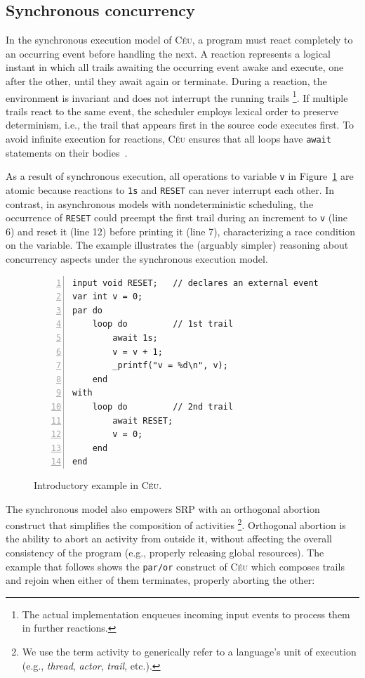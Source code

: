 \documentclass{acm_proc_article-sp}
\newcommand{\CEU}{\textsc{C\'{e}u}\xspace}
\newcommand{\code}[1] {{\small{\texttt{#1}}}}
\newcommand{\1}{\;}
\newcommand{\2}{\;\;}
\newcommand{\3}{\;\;\;}
\newcommand{\5}{\;\;\;\;\;}
\begin{document}
\subsection{Synchronous concurrency}

In the synchronous execution model of \CEU, a program must react completely to 
an occurring event before handling the next.
%
A reaction represents a logical instant in which all trails awaiting the 
occurring event awake and execute, one after the other, until they await again 
or terminate.
%
During a reaction, the environment is invariant and does not interrupt the 
running trails%
\footnote{
The actual implementation enqueues incoming input events to process them in 
further reactions.
}.
If multiple trails react to the same event, the scheduler employs lexical order 
to preserve determinism, i.e., the trail that appears first in the source code 
executes first.
%
To avoid infinite execution for reactions, \CEU ensures that all loops have 
\code{await} statements on their bodies~\cite{ceu.sensys13}.

As a result of synchronous execution, all operations to variable \code{v} in 
Figure~\ref{lst.intro} are atomic because reactions to \code{1s} and 
\code{RESET} can never interrupt each other.
%
In contrast, in asynchronous models with nondeterministic scheduling, the 
occurrence of \code{RESET} could preempt the first trail during an increment to 
\code{v} (line 6) and reset it (line 12) before printing it (line 7), 
characterizing a race condition on the variable.
%
The example illustrates the (arguably simpler) reasoning about concurrency 
aspects under the synchronous execution model.

\begin{figure}[t]
\begin{lstlisting}[numbers=left,xleftmargin=3em]
input void RESET;   // declares an external event
var int v = 0;
par do
    loop do         // 1st trail
        await 1s;
        v = v + 1;
        _printf("v = %d\n", v);
    end
with
    loop do         // 2nd trail
        await RESET;
        v = 0;
    end
end
\end{lstlisting}
\caption{ Introductory example in \CEU.
\label{lst.intro}
}
\end{figure}


The synchronous model also empowers SRP with an orthogonal abortion construct 
that simplifies the composition of activities%
\footnote{We use the term activity to generically refer to a language's unit of 
execution (e.g., \emph{thread}, \emph{actor}, \emph{trail}, etc.).}.
%
Orthogonal abortion is the ability to abort an activity from outside it, 
without affecting the overall consistency of the program (e.g., properly 
releasing global resources).
%
The example that follows shows the \code{par/or} construct of \CEU which 
composes trails and rejoin when either of them terminates, properly aborting 
the other:
\end{document}
